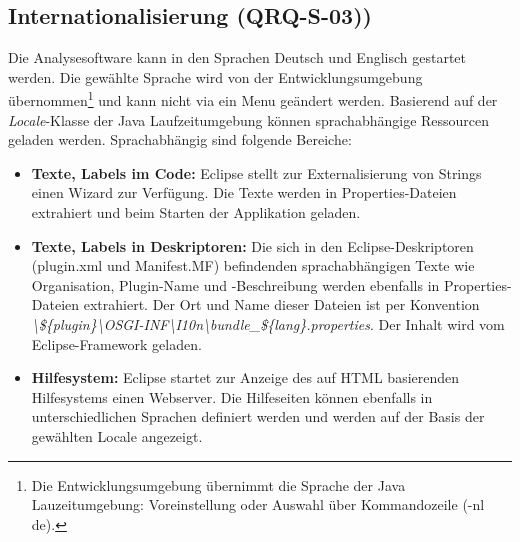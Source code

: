 \subsection{Internationalisierung (QRQ-S-03))}
Die Analysesoftware kann in den Sprachen Deutsch und Englisch gestartet werden. Die gewählte Sprache wird von der Entwicklungsumgebung übernommen\footnote{Die Entwicklungsumgebung übernimmt die Sprache der Java Lauzeitumgebung: Voreinstellung oder Auswahl über Kommandozeile (-nl de). } und kann nicht via ein Menu geändert werden. 
Basierend auf der \textit{Locale}-Klasse der Java Laufzeitumgebung können sprachabhängige Ressourcen geladen werden. Sprachabhängig sind folgende Bereiche:
\begin{itemize}
	\item \textbf{Texte, Labels im Code:} Eclipse stellt zur Externalisierung von Strings einen Wizard zur Verfügung. Die Texte werden in Properties-Dateien extrahiert und beim Starten der Applikation geladen.
	\item \textbf{Texte, Labels in Deskriptoren:} Die sich in den Eclipse-Deskriptoren (plugin.xml und Manifest.MF) befindenden sprachabhängigen Texte wie Organisation, Plugin-Name und -Beschreibung werden ebenfalls in Properties-Dateien extrahiert. Der Ort und Name dieser Dateien ist per Konvention \textit{\textbackslash \$\{plugin\}\textbackslash OSGI-INF\textbackslash I10n\textbackslash bundle\_\$\{lang\}.properties}. Der Inhalt wird vom Eclipse-Framework geladen.
	\item \textbf{Hilfesystem:} Eclipse startet zur Anzeige des auf HTML basierenden Hilfesystems einen Webserver. Die Hilfeseiten können ebenfalls in unterschiedlichen Sprachen definiert werden und werden auf der Basis der gewählten Locale angezeigt.
\end{itemize} 


